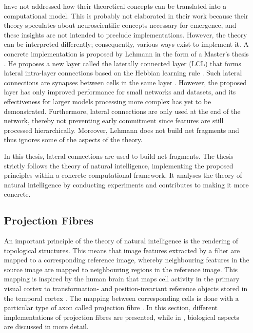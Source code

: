  have not addressed how their theoretical concepts can be translated into a computational model.
This is probably not elaborated in their work because their theory speculates about neuroscientific concepts necessary for emergence, and these insights are not intended to preclude implementations.
However, the theory can be interpreted differently; consequently, various ways exist to implement it.
A concrete implementation is proposed by Lehmann in the form of a Master's thesis \cite{lehmann_leveraging_2022}.
He proposes a new layer called the laterally connected layer (LCL) that forms lateral intra-layer connections based on the Hebbian learning rule \cite{hebb_organization_1949}.
Such lateral connections are synapses between cells in the same layer .
However, the proposed layer has only improved performance for small networks and datasets, and its effectiveness for larger models processing more complex has yet to be demonstrated.
Furthermore, lateral connections are only used at the end of the network, thereby not preventing early commitment since features are still processed hierarchically.
Moreover, Lehmann does not build net fragments and thus ignores some of the aspects of the theory.

In this thesis, lateral connections are used to build net fragments.
The thesis strictly follows the theory of natural intelligence, implementing the proposed principles within a concrete computational framework. It analyses the theory of natural intelligence by conducting experiments and contributes to making it more concrete.

\subsection{Projection Fibres}
An important principle of the theory of natural intelligence is the rendering of topological structures.
This means that image features extracted by a filter are mapped to a corresponding reference image, whereby neighbouring features in the source image are mapped to neighbouring regions in the reference image.
This mapping is inspired by the human brain that maps cell activity in the primary visual cortex  to transformation- and position-invariant reference objects stored in the 
temporal cortex .
The mapping between corresponding cells is done with a particular type of axon called projection fibre .
In this section, different implementations of projection fibres are presented, while in , biological aspects are discussed in more detail. 

